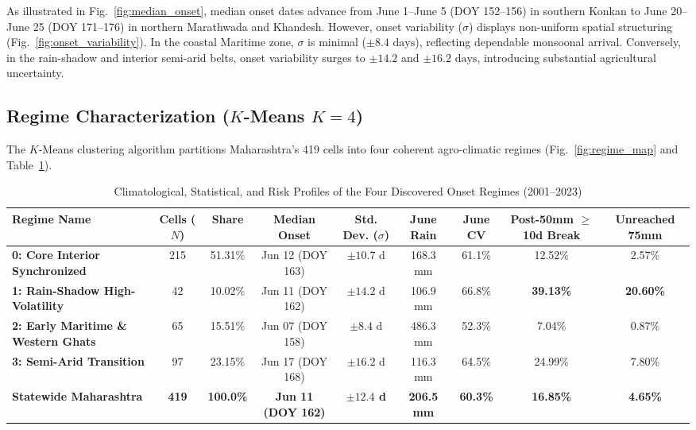 \documentclass[conference]{IEEEtran}
\begin{document}
As illustrated in Fig.~\ref{fig:median_onset}, median onset dates advance from June 1--June 5 (DOY 152--156) in southern Konkan to June 20--June 25 (DOY 171--176) in northern Marathwada and Khandesh. However, onset variability ($\sigma$) displays non-uniform spatial structuring (Fig.~\ref{fig:onset_variability}). In the coastal Maritime zone, $\sigma$ is minimal ($\pm 8.4\text{ days}$), reflecting dependable monsoonal arrival. Conversely, in the rain-shadow and interior semi-arid belts, onset variability surges to $\pm 14.2$ and $\pm 16.2\text{ days}$, introducing substantial agricultural uncertainty.

\subsection{Regime Characterization ($K$-Means $K=4$)}
The $K$-Means clustering algorithm partitions Maharashtra's 419 cells into four coherent agro-climatic regimes (Fig.~\ref{fig:regime_map} and Table~\ref{tab:regimes}).

\begin{table}[t]
\caption{Climatological, Statistical, and Risk Profiles of the Four Discovered Onset Regimes (2001--2023)}
\label{tab:regimes}
\centering
\small
\begin{tabular}{lcccccccc}
\toprule
\textbf{Regime Name} & \textbf{Cells ($N$)} & \textbf{Share} & \textbf{Median Onset} & \textbf{Std. Dev. ($\sigma$)} & \textbf{June Rain} & \textbf{June CV} & \textbf{Post-50mm $\ge$10d Break} & \textbf{Unreached 75mm} \\
\midrule
\textbf{0: Core Interior Synchronized} & 215 & 51.31\% & Jun 12 (DOY 163) & $\pm 10.7$ d & 168.3 mm & 61.1\% & 12.52\% & 2.57\% \\
\textbf{1: Rain-Shadow High-Volatility} & 42 & 10.02\% & Jun 11 (DOY 162) & $\pm 14.2$ d & 106.9 mm & 66.8\% & \textbf{39.13\%} & \textbf{20.60\%} \\
\textbf{2: Early Maritime \& Western Ghats} & 65 & 15.51\% & Jun 07 (DOY 158) & $\pm 8.4$ d & 486.3 mm & 52.3\% & 7.04\% & 0.87\% \\
\textbf{3: Semi-Arid Transition} & 97 & 23.15\% & Jun 17 (DOY 168) & $\pm 16.2$ d & 116.3 mm & 64.5\% & 24.99\% & 7.80\% \\
\midrule
\textbf{Statewide Maharashtra} & \textbf{419} & \textbf{100.0\%} & \textbf{Jun 11 (DOY 162)} & \textbf{$\pm 12.4$ d} & \textbf{206.5 mm} & \textbf{60.3\%} & \textbf{16.85\%} & \textbf{4.65\%} \\
\bottomrule
\end{tabular}
\end{table}
\end{document}
